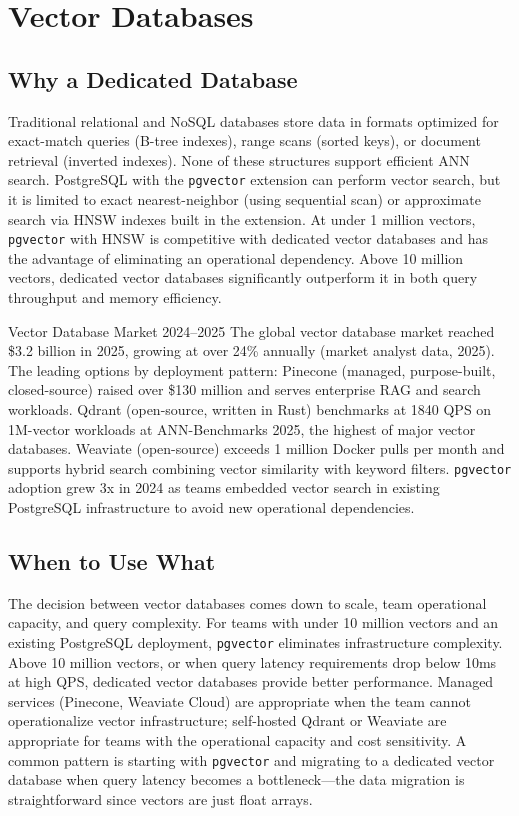 \documentclass[11pt,a4paper]{article}
\begin{document}
\section{Vector Databases}

\subsection{Why a Dedicated Database}

Traditional relational and NoSQL databases store data in formats optimized for exact-match queries (B-tree indexes), range scans (sorted keys), or document retrieval (inverted indexes). None of these structures support efficient ANN search. PostgreSQL with the \texttt{pgvector} extension can perform vector search, but it is limited to exact nearest-neighbor (using sequential scan) or approximate search via HNSW indexes built in the extension. At under 1 million vectors, \texttt{pgvector} with HNSW is competitive with dedicated vector databases and has the advantage of eliminating an operational dependency. Above 10 million vectors, dedicated vector databases significantly outperform it in both query throughput and memory efficiency.

\begin{industrybox}{Vector Database Market 2024--2025}
The global vector database market reached \$3.2 billion in 2025, growing at over 24\% annually (market analyst data, 2025). The leading options by deployment pattern: Pinecone (managed, purpose-built, closed-source) raised over \$130 million and serves enterprise RAG and search workloads. Qdrant (open-source, written in Rust) benchmarks at 1840 QPS on 1M-vector workloads at ANN-Benchmarks 2025, the highest of major vector databases. Weaviate (open-source) exceeds 1 million Docker pulls per month and supports hybrid search combining vector similarity with keyword filters. \texttt{pgvector} adoption grew 3x in 2024 as teams embedded vector search in existing PostgreSQL infrastructure to avoid new operational dependencies.
\end{industrybox}

\subsection{When to Use What}

The decision between vector databases comes down to scale, team operational capacity, and query complexity. For teams with under 10 million vectors and an existing PostgreSQL deployment, \texttt{pgvector} eliminates infrastructure complexity. Above 10 million vectors, or when query latency requirements drop below 10ms at high QPS, dedicated vector databases provide better performance. Managed services (Pinecone, Weaviate Cloud) are appropriate when the team cannot operationalize vector infrastructure; self-hosted Qdrant or Weaviate are appropriate for teams with the operational capacity and cost sensitivity. A common pattern is starting with \texttt{pgvector} and migrating to a dedicated vector database when query latency becomes a bottleneck---the data migration is straightforward since vectors are just float arrays.
\end{document}
